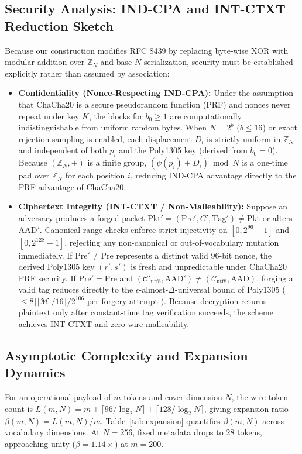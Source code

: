 \documentclass[conference]{IEEEtran}
\begin{document}
\subsection{Security Analysis: IND-CPA and INT-CTXT Reduction Sketch}
Because our construction modifies RFC 8439 by replacing byte-wise XOR with modular addition over $\mathbb{Z}_N$ and base-$N$ serialization, security must be established explicitly rather than assumed by association:
\begin{itemize}
    \item \textbf{Confidentiality (Nonce-Respecting IND-CPA):} Under the assumption that ChaCha20 is a secure pseudorandom function (PRF) and nonces never repeat under key $K$, the blocks for $b_0 \ge 1$ are computationally indistinguishable from uniform random bytes. When $N=2^b$ ($b \le 16$) or exact rejection sampling is enabled, each displacement $D_i$ is strictly uniform in $\mathbb{Z}_N$ and independent of both $p_i$ and the Poly1305 key (derived from $b_0 = 0$). Because $(\mathbb{Z}_N, +)$ is a finite group, $(\psi(p_i) + D_i) \bmod N$ is a one-time pad over $\mathbb{Z}_N$ for each position $i$, reducing IND-CPA advantage directly to the PRF advantage of ChaCha20.
    \item \textbf{Ciphertext Integrity (INT-CTXT / Non-Malleability):} Suppose an adversary produces a forged packet $\text{Pkt}' = (\text{Pre}', C', \text{Tag}') \neq \text{Pkt}$ or alters $\text{AAD}'$. Canonical range checks enforce strict injectivity on $[0, 2^{96}-1]$ and $[0, 2^{128}-1]$, rejecting any non-canonical or out-of-vocabulary mutation immediately. If $\text{Pre}' \neq \text{Pre}$ represents a distinct valid 96-bit nonce, the derived Poly1305 key $(r', s')$ is fresh and unpredictable under ChaCha20 PRF security. If $\text{Pre}' = \text{Pre}$ and $(\mathcal{C}'_{\text{utf8}}, \text{AAD}') \neq (\mathcal{C}_{\text{utf8}}, \text{AAD})$, forging a valid tag reduces directly to the $\epsilon$-almost-$\Delta$-universal bound of Poly1305 ($\le 8 \lceil |\mathcal{M}|/16 \rceil / 2^{106}$ per forgery attempt \cite{rfc8439}). Because decryption returns plaintext only after constant-time tag verification succeeds, the scheme achieves INT-CTXT and zero wire malleability.
\end{itemize}

\subsection{Asymptotic Complexity and Expansion Dynamics}
For an operational payload of $m$ tokens and cover dimension $N$, the wire token count is $L(m, N) = m + \lceil 96 / \log_2 N \rceil + \lceil 128 / \log_2 N \rceil$, giving expansion ratio $\beta(m, N) = L(m, N) / m$. Table~\ref{tab:expansion} quantifies $\beta(m, N)$ across vocabulary dimensions. At $N=256$, fixed metadata drops to 28 tokens, approaching unity ($\beta = 1.14\times$) at $m=200$.
\end{document}
